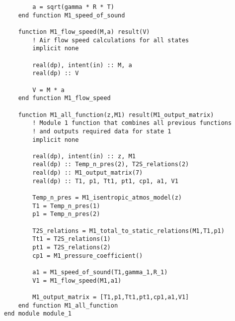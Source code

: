 \begin{verbatim}
        a = sqrt(gamma * R * T)
    end function M1_speed_of_sound

    function M1_flow_speed(M,a) result(V)
        ! Air flow speed calculations for all states
        implicit none

        real(dp), intent(in) :: M, a
        real(dp) :: V
        
        V = M * a
    end function M1_flow_speed

    function M1_all_function(z,M1) result(M1_output_matrix)
        ! Module 1 function that combines all previous functions
        ! and outputs required data for state 1
        implicit none

        real(dp), intent(in) :: z, M1
        real(dp) :: Temp_n_pres(2), T2S_relations(2)
        real(dp) :: M1_output_matrix(7)
        real(dp) :: T1, p1, Tt1, pt1, cp1, a1, V1

        Temp_n_pres = M1_isentropic_atmos_model(z)
        T1 = Temp_n_pres(1)
        p1 = Temp_n_pres(2)
        
        T2S_relations = M1_total_to_static_relations(M1,T1,p1)
        Tt1 = T2S_relations(1)
        pt1 = T2S_relations(2)
        cp1 = M1_pressure_coefficient()

        a1 = M1_speed_of_sound(T1,gamma_1,R_1)
        V1 = M1_flow_speed(M1,a1)

        M1_output_matrix = [T1,p1,Tt1,pt1,cp1,a1,V1]
    end function M1_all_function
end module module_1
\end{verbatim}